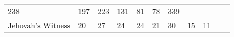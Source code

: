 \documentclass[]{article}
\begin{document}
\begin{longtable}[]{@{}lllllllllll@{}}
\begin{minipage}[t]{0.05\columnwidth}
238\strut
\end{minipage} & \begin{minipage}[t]{0.05\columnwidth}\raggedright\strut
197\strut
\end{minipage} & \begin{minipage}[t]{0.05\columnwidth}\raggedright\strut
223\strut
\end{minipage} & \begin{minipage}[t]{0.06\columnwidth}\raggedright\strut
131\strut
\end{minipage} & \begin{minipage}[t]{0.06\columnwidth}\raggedright\strut
81\strut
\end{minipage} & \begin{minipage}[t]{0.04\columnwidth}\raggedright\strut
78\strut
\end{minipage} & \begin{minipage}[t]{0.11\columnwidth}\raggedright\strut
339\strut
\end{minipage}\tabularnewline
\begin{minipage}[t]{0.14\columnwidth}\raggedright\strut
Jehovah's Witness\strut
\end{minipage} & \begin{minipage}[t]{0.04\columnwidth}\raggedright\strut
20\strut
\end{minipage} & \begin{minipage}[t]{0.05\columnwidth}\raggedright\strut
27\strut
\end{minipage} & \begin{minipage}[t]{0.05\columnwidth}\raggedright\strut
24\strut
\end{minipage} & \begin{minipage}[t]{0.05\columnwidth}\raggedright\strut
24\strut
\end{minipage} & \begin{minipage}[t]{0.05\columnwidth}\raggedright\strut
21\strut
\end{minipage} & \begin{minipage}[t]{0.05\columnwidth}\raggedright\strut
30\strut
\end{minipage} & \begin{minipage}[t]{0.06\columnwidth}\raggedright\strut
15\strut
\end{minipage} & \begin{minipage}[t]{0.06\columnwidth}\raggedright\strut
11\strut
\end{minipage} & \begin{minipage}[t]{0.04\columnwidth}\raggedright\strut

\end{minipage}
\end{longtable}
\end{document}
